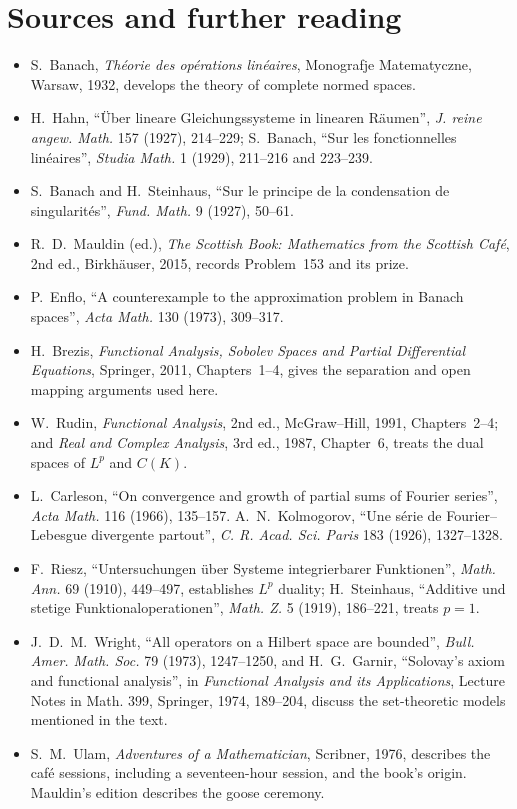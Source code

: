 \section*{Sources and further reading}
\begin{itemize}
\item S.~Banach, \emph{Th\'eorie des op\'erations lin\'eaires}, Monografje Matematyczne, Warsaw, 1932, develops the theory of complete normed spaces.
\item H.~Hahn, ``\"Uber lineare Gleichungssysteme in linearen R\"aumen'', \emph{J. reine angew. Math.} 157 (1927), 214--229; S.~Banach, ``Sur les fonctionnelles lin\'eaires'', \emph{Studia Math.} 1 (1929), 211--216 and 223--239.
\item S.~Banach and H.~Steinhaus, ``Sur le principe de la condensation de singularit\'es'', \emph{Fund. Math.} 9 (1927), 50--61.
\item R.~D.~Mauldin (ed.), \emph{The Scottish Book: Mathematics from the Scottish Caf\'e}, 2nd ed., Birkh\"auser, 2015, records Problem~153 and its prize.
\item P.~Enflo, ``A counterexample to the approximation problem in Banach spaces'', \emph{Acta Math.} 130 (1973), 309--317.
\item H.~Brezis, \emph{Functional Analysis, Sobolev Spaces and Partial Differential Equations}, Springer, 2011, Chapters~1--4, gives the separation and open mapping arguments used here.
\item W.~Rudin, \emph{Functional Analysis}, 2nd ed., McGraw--Hill, 1991, Chapters~2--4; and \emph{Real and Complex Analysis}, 3rd ed., 1987, Chapter~6, treats the dual spaces of $L^p$ and $C(K)$.
\item L.~Carleson, ``On convergence and growth of partial sums of Fourier series'', \emph{Acta Math.} 116 (1966), 135--157. A.~N.~Kolmogorov, ``Une s\'erie de Fourier--Lebesgue divergente partout'', \emph{C. R. Acad. Sci. Paris} 183 (1926), 1327--1328.
\item F.~Riesz, ``Untersuchungen \"uber Systeme integrierbarer Funktionen'', \emph{Math. Ann.} 69 (1910), 449--497, establishes $L^p$ duality; H.~Steinhaus, ``Additive und stetige Funktionaloperationen'', \emph{Math. Z.} 5 (1919), 186--221, treats $p=1$.
\item J.~D.~M.~Wright, ``All operators on a Hilbert space are bounded'', \emph{Bull. Amer. Math. Soc.} 79 (1973), 1247--1250, and H.~G.~Garnir, ``Solovay's axiom and functional analysis'', in \emph{Functional Analysis and its Applications}, Lecture Notes in Math. 399, Springer, 1974, 189--204, discuss the set-theoretic models mentioned in the text.
\item S.~M.~Ulam, \emph{Adventures of a Mathematician}, Scribner, 1976, describes the caf\'e sessions, including a seventeen-hour session, and the book's origin. Mauldin's edition describes the goose ceremony.
\end{itemize}
